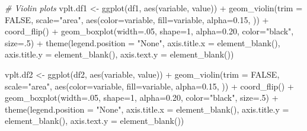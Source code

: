 \documentclass[
]{article}
\newenvironment{Shaded}{\begin{snugshade}}{\end{snugshade}}
\newcommand{\AttributeTok}[1]{\textcolor[rgb]{0.77,0.63,0.00}{#1}}
\newcommand{\CommentTok}[1]{\textcolor[rgb]{0.56,0.35,0.01}{\textit{#1}}}
\newcommand{\ConstantTok}[1]{\textcolor[rgb]{0.00,0.00,0.00}{#1}}
\newcommand{\DecValTok}[1]{\textcolor[rgb]{0.00,0.00,0.81}{#1}}
\newcommand{\FloatTok}[1]{\textcolor[rgb]{0.00,0.00,0.81}{#1}}
\newcommand{\FunctionTok}[1]{\textcolor[rgb]{0.00,0.00,0.00}{#1}}
\newcommand{\NormalTok}[1]{#1}
\newcommand{\OtherTok}[1]{\textcolor[rgb]{0.56,0.35,0.01}{#1}}
\newcommand{\SpecialCharTok}[1]{\textcolor[rgb]{0.00,0.00,0.00}{#1}}
\newcommand{\StringTok}[1]{\textcolor[rgb]{0.31,0.60,0.02}{#1}}
\begin{document}
\begin{Shaded}
\begin{Highlighting}[]
\CommentTok{\# Violin plots}
\NormalTok{vplt.df1 }\OtherTok{\textless{}{-}} \FunctionTok{ggplot}\NormalTok{(df1, }\FunctionTok{aes}\NormalTok{(variable, value)) }\SpecialCharTok{+} 
  \FunctionTok{geom\_violin}\NormalTok{(}\AttributeTok{trim =} \ConstantTok{FALSE}\NormalTok{, }\AttributeTok{scale=}\StringTok{"area"}\NormalTok{, }
              \FunctionTok{aes}\NormalTok{(}\AttributeTok{color=}\NormalTok{variable, }\AttributeTok{fill=}\NormalTok{variable, }\AttributeTok{alpha=}\FloatTok{0.15}\NormalTok{, )) }\SpecialCharTok{+} \FunctionTok{coord\_flip}\NormalTok{() }\SpecialCharTok{+} 
  \FunctionTok{geom\_boxplot}\NormalTok{(}\AttributeTok{width=}\NormalTok{.}\DecValTok{05}\NormalTok{, }\AttributeTok{shape=}\DecValTok{1}\NormalTok{, }\AttributeTok{alpha=}\FloatTok{0.20}\NormalTok{, }\AttributeTok{color=}\StringTok{"black"}\NormalTok{, }\AttributeTok{size=}\NormalTok{.}\DecValTok{5}\NormalTok{) }\SpecialCharTok{+} 
  \FunctionTok{theme}\NormalTok{(}\AttributeTok{legend.position =} \StringTok{"None"}\NormalTok{, }
        \AttributeTok{axis.title.x =} \FunctionTok{element\_blank}\NormalTok{(), }
        \AttributeTok{axis.title.y =} \FunctionTok{element\_blank}\NormalTok{(), }\AttributeTok{axis.text.y =} \FunctionTok{element\_blank}\NormalTok{())}

\NormalTok{vplt.df2 }\OtherTok{\textless{}{-}} \FunctionTok{ggplot}\NormalTok{(df2, }\FunctionTok{aes}\NormalTok{(variable, value)) }\SpecialCharTok{+} 
  \FunctionTok{geom\_violin}\NormalTok{(}\AttributeTok{trim =} \ConstantTok{FALSE}\NormalTok{, }\AttributeTok{scale=}\StringTok{"area"}\NormalTok{, }
              \FunctionTok{aes}\NormalTok{(}\AttributeTok{color=}\NormalTok{variable, }\AttributeTok{fill=}\NormalTok{variable, }\AttributeTok{alpha=}\FloatTok{0.15}\NormalTok{, )) }\SpecialCharTok{+} \FunctionTok{coord\_flip}\NormalTok{() }\SpecialCharTok{+} 
  \FunctionTok{geom\_boxplot}\NormalTok{(}\AttributeTok{width=}\NormalTok{.}\DecValTok{05}\NormalTok{, }\AttributeTok{shape=}\DecValTok{1}\NormalTok{, }\AttributeTok{alpha=}\FloatTok{0.20}\NormalTok{, }\AttributeTok{color=}\StringTok{"black"}\NormalTok{, }\AttributeTok{size=}\NormalTok{.}\DecValTok{5}\NormalTok{) }\SpecialCharTok{+} 
  \FunctionTok{theme}\NormalTok{(}\AttributeTok{legend.position =} \StringTok{"None"}\NormalTok{, }
        \AttributeTok{axis.title.x =} \FunctionTok{element\_blank}\NormalTok{(), }
        \AttributeTok{axis.title.y =} \FunctionTok{element\_blank}\NormalTok{(), }\AttributeTok{axis.text.y =} \FunctionTok{element\_blank}\NormalTok{())}


\end{Highlighting}
\end{Shaded}
\end{document}

